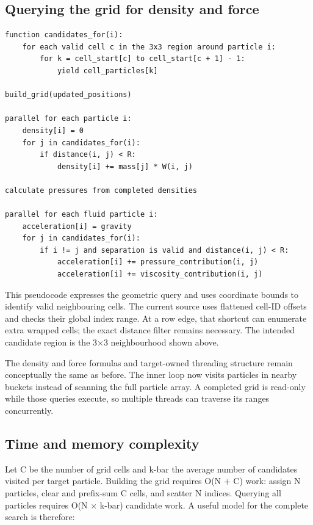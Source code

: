\documentclass[
  11pt,
]{article}
\begin{document}
\subsection{Querying the grid for density and
force}\label{querying-the-grid-for-density-and-force}

\begin{verbatim}
function candidates_for(i):
    for each valid cell c in the 3x3 region around particle i:
        for k = cell_start[c] to cell_start[c + 1] - 1:
            yield cell_particles[k]

build_grid(updated_positions)

parallel for each particle i:
    density[i] = 0
    for j in candidates_for(i):
        if distance(i, j) < R:
            density[i] += mass[j] * W(i, j)

calculate pressures from completed densities

parallel for each fluid particle i:
    acceleration[i] = gravity
    for j in candidates_for(i):
        if i != j and separation is valid and distance(i, j) < R:
            acceleration[i] += pressure_contribution(i, j)
            acceleration[i] += viscosity_contribution(i, j)
\end{verbatim}

This pseudocode expresses the geometric query and uses coordinate bounds
to identify valid neighbouring cells. The current source uses flattened
cell-ID offsets and checks their global index range. At a row edge, that
shortcut can enumerate extra wrapped cells; the exact distance filter
remains necessary. The intended candidate region is the 3×3
neighbourhood shown above.

The density and force formulas and target-owned threading structure
remain conceptually the same as before. The inner loop now visits
particles in nearby buckets instead of scanning the full particle array.
A completed grid is read-only while those queries execute, so multiple
threads can traverse its ranges concurrently.

\subsection{Time and memory
complexity}\label{time-and-memory-complexity}

Let C be the number of grid cells and k-bar the average number of
candidates visited per target particle. Building the grid requires O(N +
C) work: assign N particles, clear and prefix-sum C cells, and scatter N
indices. Querying all particles requires O(N × k-bar) candidate work. A
useful model for the complete search is therefore:
\end{document}
